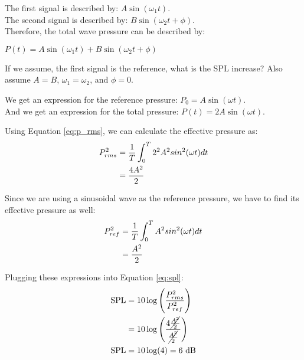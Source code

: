     \begin{kaobox}[frametitle=Aside: What if we add harmonic signals]
        The first signal is described by: $A \sin(\omega_1 t)$. \\
        The second signal is described by: $B \sin(\omega_2 t + \phi)$. \\
        Therefore, the total wave pressure can be described by:
        \begin{center}
            $ P(t) = A \sin(\omega_1 t) + B \sin(\omega_2 t + \phi)$
        \end{center}

        If we assume, the first signal is the reference, what is the SPL increase?
        Also assume $A=B$, $\omega_1 = \omega_2$, and $\phi=0$.

        We get an expression for the reference pressure: $P_0 = A \sin(\omega t)$. \\
        And we get an expression for the total pressure: $P(t) = 2A \sin(\omega t)$.

        Using Equation \ref{eq:p_rms}, we can calculate the effective pressure as:
        \begin{align}
            P_{rms}^2   &= \frac{1}{T} \int_{0}^{T} 2^2 A^2 sin^2(\omega t) dt \notag \\
                        &= \frac{4A^2}{2} \notag
        \end{align}

        Since we are using a sinusoidal wave as the reference pressure, we have to find its effective pressure as well:
        \begin{align}
            P_{ref}^2   &= \frac{1}{T} \int_{0}^{T} A^2 sin^2(\omega t) dt \notag \\
                        &= \frac{A^2}{2} \notag
        \end{align}

        Plugging these expressions into Equation \ref{eq:spl}:
        \begin{align}
            \text{SPL}  &= 10 \log\left(\frac{P_{rms}^2}{P_{ref}^2}\right) \notag \\
                        &= 10 \log\left(\frac{4\cancel{\frac{A^2}{2}}}{\cancel{\frac{A^2}{2}}}\right) \notag \\
            \text{SPL}  &= 10 \log(4) = 6 \text{ dB} \notag
        \end{align}
    \end{kaobox}
